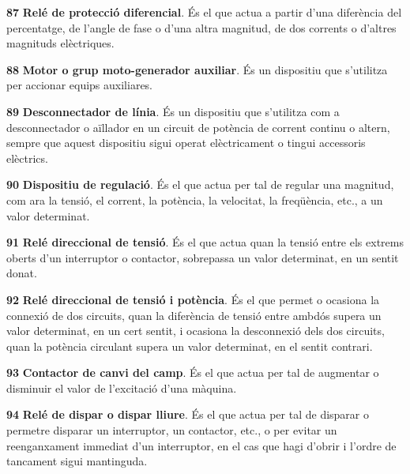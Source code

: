 \begin{multicols}{2}
\begin{list}{}
\item[\textbf{87}]   
\textbf{Relé de protecció
diferencial}. És el que actua a partir d'una diferència  del percentatge, de l'angle de fase o d'una altra magnitud, de dos corrents
o d'altres magnituds elèctriques.

\item[\textbf{88}]  
 \textbf{Motor o grup
moto-generador auxiliar}. És un dispositiu que s'utilitza per
accionar equips auxiliares.

\item[\textbf{89}]  
 \textbf{Desconnectador de línia}. És
un dispositiu que s'utilitza com a desconnectador o aïllador en un
circuit de potència de corrent continu o altern, sempre que aquest
dispositiu sigui operat elèctricament o tingui accessoris elèctrics.

\item[\textbf{90}]   
\textbf{Dispositiu de regulació}. És el que
actua per tal de regular una magnitud, com ara la tensió, el corrent, la potència,
la velocitat, la freqüència, etc., a un valor determinat.

\item[\textbf{91}]   
\textbf{Relé direccional de tensió}.
És el que actua quan la tensió entre els extrems oberts d'un
interruptor o contactor, sobrepassa un valor determinat, en un
sentit donat.

\item[\textbf{92}]   
\textbf{Relé direccional
de tensió i potència}. És el que permet o ocasiona la connexió de
dos circuits, quan la diferència de tensió entre ambdós supera un
valor determinat, en un cert sentit, i ocasiona la desconnexió dels
dos circuits, quan la potència circulant supera un valor determinat,
en el sentit contrari.

\item[\textbf{93}]   
\textbf{Contactor de canvi del camp}. És el
que actua per tal de augmentar o disminuir el valor de l'excitació
d'una màquina.

\item[\textbf{94}]   
\textbf{Relé de dispar o dispar
lliure}. És el que actua per tal de disparar o permetre disparar un
interruptor, un contactor, etc., o per evitar un reenganxament
immediat d'un interruptor, en el cas que hagi d'obrir i l'ordre de
tancament sigui mantinguda.


\end{list}
\end{multicols}
